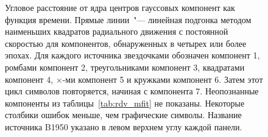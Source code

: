 \begin{figure}[]
 \caption{Угловое расстояние от ядра центров гауссовых компонент как функция времени.
Прямые линии~"--- линейная подгонка методом наименьших квадратов радиального движения с постоянной
скоростью для компонентов, обнаруженных в четырех или более эпохах. Для каждого источника
звездочками обозначен компонент 1, ромбами компонент 2, треугольниками компонент 3, квадратами
компонент 4, $\times$-ми компонент 5 и кружками компонент 6. Затем этот цикл символов
повторяется, начиная с компонента 7. Неопознанные компоненты из таблицы~\ref{tab:rdv_mfit} не
показаны. Некоторые столбики ошибок меньше, чем графические символы. Название источника B1950
указано в левом верхнем углу каждой панели.}
 \label{fig:rdv_sep}
\end{figure}

